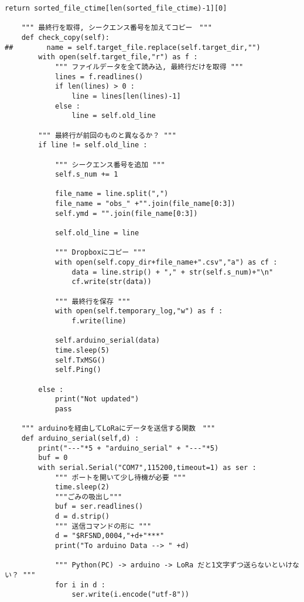 \begin{lstlisting}[label=loras,caption=LoRa\_obs\_transmit.py]
        return sorted_file_ctime[len(sorted_file_ctime)-1][0]
        
    """ 最終行を取得, シークエンス番号を加えてコピー　"""    
    def check_copy(self):
##        name = self.target_file.replace(self.target_dir,"")
        with open(self.target_file,"r") as f :
            """ ファイルデータを全て読み込, 最終行だけを取得 """
            lines = f.readlines()
            if len(lines) > 0 :
                line = lines[len(lines)-1]
            else :
                line = self.old_line
            
        """ 最終行が前回のものと異なるか？ """
        if line != self.old_line :
            
            """ シークエンス番号を追加 """
            self.s_num += 1
            
            file_name = line.split(",")
            file_name = "obs_" +"".join(file_name[0:3])
            self.ymd = "".join(file_name[0:3])

            self.old_line = line

            """ Dropboxにコピー """
            with open(self.copy_dir+file_name+".csv","a") as cf :
                data = line.strip() + "," + str(self.s_num)+"\n"
                cf.write(str(data))
            
            """ 最終行を保存 """
            with open(self.temporary_log,"w") as f :
                f.write(line)

            self.arduino_serial(data)
            time.sleep(5)
            self.TxMSG()
            self.Ping()
                    
        else :
            print("Not updated")
            pass

    """ arduinoを経由してLoRaにデータを送信する関数　"""
    def arduino_serial(self,d) :
        print("---"*5 + "arduino_serial" + "---"*5)
        buf = 0
        with serial.Serial("COM7",115200,timeout=1) as ser :
            """ ポートを開いて少し待機が必要 """
            time.sleep(2)            
            """ごみの吸出し"""
            buf = ser.readlines()                       
            d = d.strip()
            """ 送信コマンドの形に """
            d = "$RFSND,0004,"+d+"***"
            print("To arduino Data --> " +d)
            
            """ Python(PC) -> arduino -> LoRa だと1文字ずつ送らないといけない？ """
            for i in d :
                ser.write(i.encode("utf-8"))                


\end{lstlisting}
